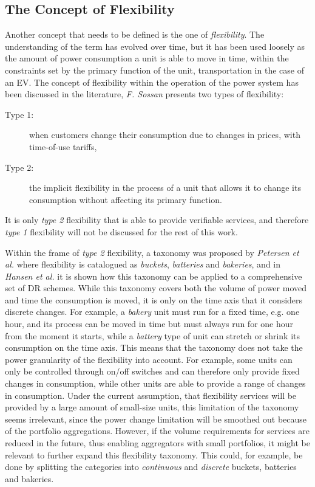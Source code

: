 \subsection{The Concept of Flexibility} %
\label{sub:Flexibility}
Another concept that needs to be defined is the one of \emph{flexibility}. The understanding of the term has evolved over time, but it has been used loosely as the amount of power consumption a unit is able to move in time, within the constraints set by the primary function of the unit, \eg transportation in the case of an EV. The concept of flexibility within the operation of the power system has been discussed in the literature, \eg \emph{F. Sossan} presents two types of flexibility: 
\begin{description}
	\item[Type 1:] when customers change their consumption due to changes in prices, \eg with time-of-use tariffs,
	\item[Type 2:] the implicit flexibility in the process of a unit that allows it to change its consumption without affecting its primary function.
\end{description}
It is only \emph{type 2} flexibility that is able to provide verifiable services, and therefore \emph{type 1} flexibility will not be discussed for the rest of this work.

Within the frame of \emph{type 2} flexibility, a taxonomy was proposed by \emph{Petersen et al.} where flexibility is catalogued as \emph{buckets}, \emph{batteries} and \emph{bakeries}, and in \emph{Hansen et al.} it is shown how this taxonomy can be applied to a comprehensive set of DR schemes. While this taxonomy covers both the volume of power moved and time the consumption is moved, it is only on the time axis that it considers discrete changes. For example, a \emph{bakery} unit must run for a fixed time, e.g. one hour, and its process can be moved in time but must always run for one hour from the moment it starts, while a \emph{battery} type of unit can stretch or shrink its consumption on the time axis. This means that the taxonomy does not take the power granularity of the flexibility into account. For example, some units can only be controlled through on/off switches and can therefore only provide fixed changes in consumption, while other units are able to provide a range of changes in consumption. Under the current assumption, \ie that flexibility services will be provided by a large amount of small-size units, this limitation of the taxonomy seems irrelevant, since the power change limitation will be smoothed out because of the portfolio aggregations. However, if the volume requirements for services are reduced in the future, thus enabling aggregators with small portfolios, it might be relevant to further expand this flexibility taxonomy. This could, for example, be done by splitting the categories into \emph{continuous} and \emph{discrete} buckets, batteries and bakeries.

